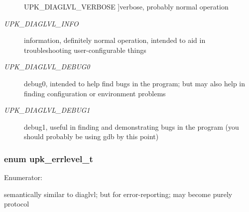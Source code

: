 \begin{Desc}
\begin{description}
{UPK\_\-DIAGLVL\_\-VERBOSE\label{group__upk__errors_gge29e017a754f6b29049ff0f27f756ef954175b1982f6aa133732d1c8e0077ec1}
}]verbose, probably normal operation \item[{\em 
UPK\_\-DIAGLVL\_\-INFO\label{group__upk__errors_gge29e017a754f6b29049ff0f27f756ef9d27ee47f717fb9634ab0090d1ddb8224}
}]information, definitely normal operation, intended to aid in troubleshooting user-configurable things \item[{\em 
UPK\_\-DIAGLVL\_\-DEBUG0\label{group__upk__errors_gge29e017a754f6b29049ff0f27f756ef9eeb0a05d0104bf6cd0d0bf9968d39841}
}]debug0, intended to help find bugs in the program; but may also help in finding configuration or environment problems \item[{\em 
UPK\_\-DIAGLVL\_\-DEBUG1\label{group__upk__errors_gge29e017a754f6b29049ff0f27f756ef9ac5a970a733c4a5ca26e8907e14004af}
}]debug1, useful in finding and demonstrating bugs in the program (you should probably be using gdb by this point) \end{description}
\end{Desc}

\subsubsection{\setlength{\rightskip}{0pt plus 5cm}enum \bf{upk\_\-errlevel\_\-t}}\label{group__upk__errors_g65014efaaa7043802b4d332b51282fa3}


\begin{Desc}
\item[Enumerator: ]\par
\begin{description}
\item[{\em 
UPK\_\-ERRLVL\_\-ERROR\label{group__upk__errors_gg65014efaaa7043802b4d332b51282fa31cad07c63b2efce1e844eaeb9b4bea66}
}]semantically similar to diaglvl; but for error-reporting; may become purely protocol \end{description}
\end{Desc}


